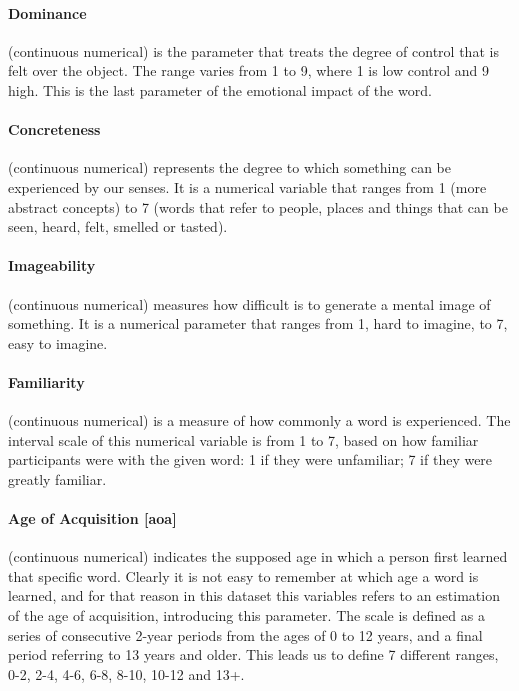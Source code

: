 \documentclass[a4paper,11pt,dvipsnames]{article}
\begin{document}
\paragraph{Dominance} (continuous numerical) is the parameter that treats the degree of control that is felt over the object. The range varies from 1 to 9, where 1 is low control and 9 high. This is the last parameter of the emotional impact of the word.
%
%
\paragraph{Concreteness} (continuous numerical) represents the degree to which something can be experienced by our senses. It is a numerical variable that ranges from 1 (more abstract concepts) to 7 (words that refer to people, places and things that can be seen, heard, felt, smelled or tasted).

\paragraph{Imageability} (continuous numerical) measures how difficult is to generate a mental image of something. It is a numerical parameter that ranges from 1, hard to imagine, to 7, easy to imagine. 

\paragraph{Familiarity} (continuous numerical) is a measure of how commonly a word is experienced. The interval scale of this numerical variable is from 1 to 7, based on how familiar participants were with the given word: 1 if they were unfamiliar; 7 if they were greatly familiar. 


\paragraph{Age of Acquisition [aoa]} (continuous numerical) indicates the supposed age in which a person first learned that specific word. Clearly it is not easy to remember at which age a word is learned, and for that reason in this dataset this variables refers to an estimation of the age of acquisition, introducing this parameter. The scale is defined as a series of consecutive 2-year periods from the ages of 0 to 12 years, and a final period referring to 13 years and older. This leads us to define 7 different ranges, 0-2, 2-4, 4-6, 6-8, 8-10, 10-12 and 13+.
\end{document}
